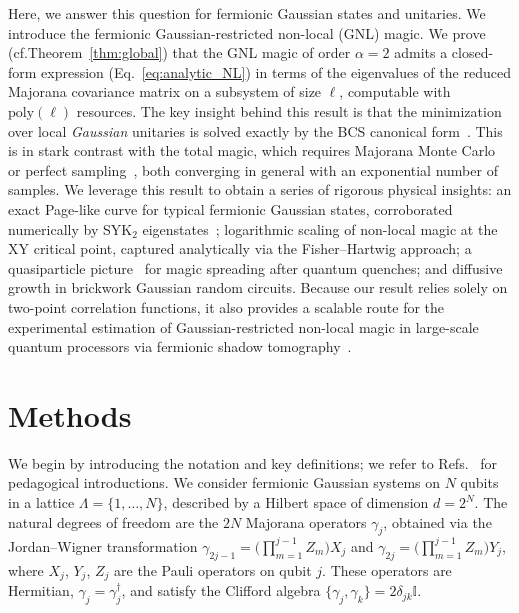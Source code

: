 \documentclass[prx,twocolumn,superscriptaddress,aps,10pt, frontmatterverbose, reprint,footinbib,longbibliography=true]{revtex4-2}
\newcommand{\RENYI}{\alpha}
\begin{document}
Here, we answer this question for fermionic Gaussian states and unitaries. We introduce the fermionic Gaussian-restricted non-local (GNL) magic.
We prove (cf.Theorem~\ref{thm:global}) that the GNL magic of order $\RENYI=2$ admits a closed-form expression (Eq.~\eqref{eq:analytic_NL}) in terms of the eigenvalues of the reduced Majorana covariance matrix on a subsystem of size $\ell$, computable with $\mathrm{poly}(\ell)$ resources. 
The key insight behind this result is that the minimization over local \emph{Gaussian} unitaries is solved exactly by the BCS canonical form~\cite{BoteroReznik2004}. 
This is in stark contrast with the total magic, which requires Majorana Monte Carlo~\cite{Bera_2025} or perfect sampling~\cite{collura2026nonstabilizernessfermionicgaussianstates}, both converging in general with an exponential number of samples.
We leverage this result to obtain a series of rigorous physical insights: an exact Page-like curve for typical fermionic Gaussian states, corroborated numerically by SYK$_2$ eigenstates~\cite{Bera_2025,santra2025complexitytransitionschaoticquantum,jasser2025stabilizer, malvimat2026multipartitenonlocalmagicsyk, njgn-fksh}; logarithmic scaling of non-local magic at the XY critical point, captured analytically via the Fisher--Hartwig approach; a quasiparticle picture~\cite{calabrese2009} for magic spreading after quantum quenches; and diffusive growth in brickwork Gaussian random circuits.
Because our result relies solely on two-point correlation functions, it also provides a scalable route for the experimental estimation of Gaussian-restricted non-local magic in large-scale quantum processors via fermionic shadow tomography~\cite{Wan_2023}.

\section{Methods}
\label{sec:methods}
We begin by introducing the notation and key definitions; we refer to Refs.~\cite{Mbeng2024,surace,sierant2026fermionic,sierant2026theorymatchgatecommutant} for pedagogical introductions.
We consider fermionic Gaussian systems on $N$ qubits in a lattice $\Lambda=\{1,\dots, N\}$, described by a Hilbert space of dimension $d=2^N$.
The natural degrees of freedom are the $2N$ Majorana operators $\gamma_j$, obtained via the Jordan--Wigner transformation $\gamma_{2j-1} = \bigl(\prod_{m=1}^{j-1} Z_m\bigr)X_j$ and $\gamma_{2j} = \bigl(\prod_{m=1}^{j-1} Z_m\bigr)Y_j$, where $X_j$, $Y_j$, $Z_j$ are the Pauli operators on qubit $j$.
These operators are Hermitian, $\gamma_j=\gamma_j^\dagger$, and satisfy the Clifford algebra $\lbrace \gamma_j,\gamma_k\}=2 \delta_{jk} \mathbb{I}$.
\end{document}
